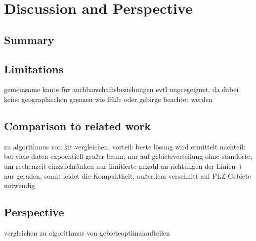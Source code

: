 \section{Discussion and Perspective}
\subsection{Summary}
\subsection{Limitations}

gemeinsame kante für anchbarschaftsbeziehungen evtl ungeegeignet, da dabei keine geographischen grenzen wie flüße oder gebirge beachtet werden

\subsection{Comparison to related work}

zu algorithmus von kit vergleichen:
vorteil: beste lösung wird ermittelt
nachteil: bei viele daten expoentiell großer baum, nur auf gebietsverteilung ohne standorte, um rechenzeit einzsuchränken nur limitierte anzahl an richtungen der Linien + nur geraden, somit leidet die Kompaktheit, außerdem verschnitt auf PLZ-Gebiete notwendig




\subsection{Perspective}

vergleichen zu algorithmus von gebieteoptimalaufteilen